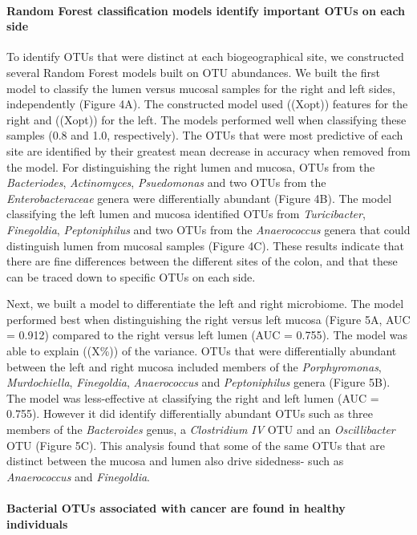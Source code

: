 \documentclass[11pt,]{article}
\let\oldparagraph\paragraph
\renewcommand{\paragraph}[1]{\oldparagraph{#1}\mbox{}}
\begin{document}
\paragraph{Random Forest classification models identify important OTUs
on each
side}\label{random-forest-classification-models-identify-important-otus-on-each-side}

To identify OTUs that were distinct at each biogeographical site, we
constructed several Random Forest models built on OTU abundances. We
built the first model to classify the lumen versus mucosal samples for
the right and left sides, independently (Figure 4A). The constructed
model used ((Xopt)) features for the right and ((Xopt)) for the left.
The models performed well when classifying these samples (0.8 and 1.0,
respectively). The OTUs that were most predictive of each site are
identified by their greatest mean decrease in accuracy when removed from
the model. For distinguishing the right lumen and mucosa, OTUs from the
\emph{Bacteriodes}, \emph{Actinomyces}, \emph{Psuedomonas} and two OTUs
from the \emph{Enterobacteraceae} genera were differentially abundant
(Figure 4B). The model classifying the left lumen and mucosa identified
OTUs from \emph{Turicibacter}, \emph{Finegoldia}, \emph{Peptoniphilus}
and two OTUs from the \emph{Anaerococcus} genera that could distinguish
lumen from mucosal samples (Figure 4C). These results indicate that
there are fine differences between the different sites of the colon, and
that these can be traced down to specific OTUs on each side.

Next, we built a model to differentiate the left and right microbiome.
The model performed best when distinguishing the right versus left
mucosa (Figure 5A, AUC = 0.912) compared to the right versus left lumen
(AUC = 0.755). The model was able to explain ((X\%)) of the variance.
OTUs that were differentially abundant between the left and right mucosa
included members of the \emph{Porphyromonas}, \emph{Murdochiella},
\emph{Finegoldia}, \emph{Anaerococcus} and \emph{Peptoniphilus} genera
(Figure 5B). The model was less-effective at classifying the right and
left lumen (AUC = 0.755). However it did identify differentially
abundant OTUs such as three members of the \emph{Bacteroides} genus, a
\emph{Clostridium IV} OTU and an \emph{Oscillibacter} OTU (Figure 5C).
This analysis found that some of the same OTUs that are distinct between
the mucosa and lumen also drive sidedness- such as \emph{Anaerococcus}
and \emph{Finegoldia}.

\paragraph{Bacterial OTUs associated with cancer are found in healthy
individuals}\label{bacterial-otus-associated-with-cancer-are-found-in-healthy-individuals}
\end{document}
